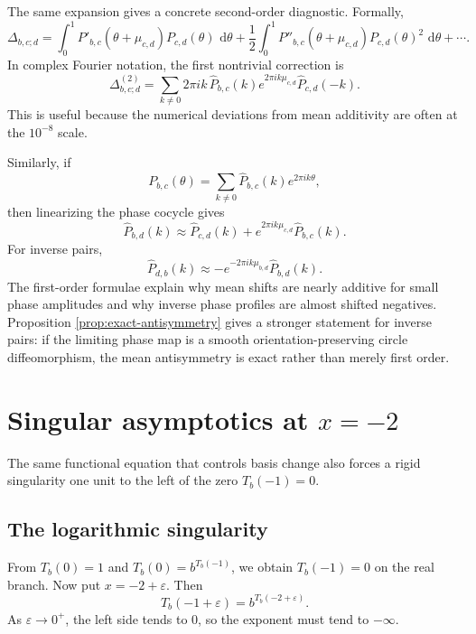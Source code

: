 \documentclass[11pt,a4paper]{article}
\theoremstyle{plain}
\theoremstyle{definition}
\theoremstyle{remark}
\newcommand{\dd}{\,\mathrm{d}}
\begin{document}
The same expansion gives a concrete second-order diagnostic.  Formally,
\[
\Delta_{b,c;d}
=\int_0^1 P'_{b,c}(\theta+\mu_{c,d})P_{c,d}(\theta)\,\dd\theta
+\frac12\int_0^1P''_{b,c}(\theta+\mu_{c,d})P_{c,d}(\theta)^2\,\dd\theta+
\cdots .
\]
In complex Fourier notation, the first nontrivial correction is
\begin{equation}\label{eq:second-order-delta}
  \Delta^{(2)}_{b,c;d}
  =\sum_{k\ne0}2\pi i k\,\widehat P_{b,c}(k)e^{2\pi i k\mu_{c,d}}\widehat P_{c,d}(-k).
\end{equation}
This is useful because the numerical deviations from mean additivity are often at the $10^{-8}$ scale.

Similarly, if
\[
  P_{b,c}(\theta)=\sum_{k\ne0}\widehat P_{b,c}(k)e^{2\pi i k\theta},
\]
then linearizing the phase cocycle gives
\begin{equation}\label{eq:fourier-cocycle}
  \widehat P_{b,d}(k)\approx \widehat P_{c,d}(k)+e^{2\pi i k\mu_{c,d}}\widehat P_{b,c}(k).
\end{equation}
For inverse pairs,
\begin{equation}\label{eq:fourier-inverse}
  \widehat P_{d,b}(k)\approx -e^{-2\pi i k\mu_{b,d}}\widehat P_{b,d}(k).
\end{equation}
The first-order formulae explain why mean shifts are nearly additive for small phase amplitudes and why inverse phase profiles are almost shifted negatives.  Proposition \ref{prop:exact-antisymmetry} gives a stronger statement for inverse pairs: if the limiting phase map is a smooth orientation-preserving circle diffeomorphism, the mean antisymmetry is exact rather than merely first order.

\section{Singular asymptotics at \texorpdfstring{$x=-2$}{x=-2}}

The same functional equation that controls basis change also forces a rigid singularity one unit to the left of the zero $T_b(-1)=0$.

\subsection{The logarithmic singularity}

From $T_b(0)=1$ and $T_b(0)=b^{T_b(-1)}$, we obtain $T_b(-1)=0$ on the real branch.  Now put $x=-2+\varepsilon$.  Then
\[
  T_b(-1+\varepsilon)=b^{T_b(-2+\varepsilon)}.
\]
As $\varepsilon\to0^+$, the left side tends to $0$, so the exponent must tend to $-\infty$.
\end{document}
